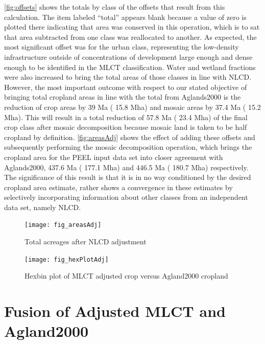 \autoref{fig:offsets} shows the totals by class of the offsets that
result from this calculation.  The item labeled ``total'' appears
blank because a value of zero is plotted there indicating that area
was conserved in this operation, which is to sat that area subtracted
from one class was reallocated to another.  As expected, the most
significant offset was for the urban class, representing the
low-density infrastructure outside of concentrations of development
large enough and dense enough to be identified in the MLCT
classification.  Water and wetland fractions were also increased to
bring the total areas of those classes in line with NLCD.  However,
the most important outcome with respect to our stated objective of
bringing total cropland areas in line with the total from Aglands2000
is the reduction of crop areas by
39 Ma ( 15.8 Mha) and mosaic areas
by 37.4 Ma ( 15.2 Mha).  This will
result in a total reduction of
57.8 Ma ( 23.4 Mha)
of the final crop class after mosaic decomposition because mosaic land
is taken to be half cropland by definition.  \autoref{fig:areasAdj}
shows the effect of adding these offsets and subsequently performing
the mosaic decomposition operation, which brings the cropland area for
the PEEL input data set into closer agreement with Aglands2000,
437.6 Ma ( 177.1 Mha) and
446.5 Ma ( 180.7 Mha) respectively. The
significance of this result is that it is in no way conditioned by the
desired cropland area estimate, rather shows a convergence in these
estimates by selectively incorporating information about other classes
from an independent data set, namely NLCD.

\begin{figure}[ht]
  \centering


  \texttt{[image: fig\_areasAdj]}
  \caption{Total acreages after NLCD adjustment}
  \label{fig:areasAdj}
\end{figure}


\begin{figure}[ht] 
  \centering

    \texttt{[image: fig\_hexPlotAdj]}
  \caption{Hexbin plot of MLCT adjusted crop versus Agland2000 cropland}
  \label{fig:hexPlotAdj} 
\end{figure} 


\section{Fusion of Adjusted MLCT and Agland2000}
\label{sec:fusion}



